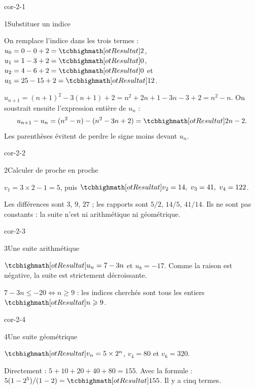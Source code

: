 \corrigesSouples

\begin{blocLivre}{cor-2-1}
\begin{corrige}{1}{Substituer un indice}
\begin{questions}
\item On remplace l’indice dans les trois termes : $u_0=0-0+2=\res{2}$,
$u_1=1-3+2=\res{0}$, $u_2=4-6+2=\res{0}$ et $u_5=25-15+2=\res{12}$.
\item $u_{n+1}=(n+1)^2-3(n+1)+2=n^2+2n+1-3n-3+2=n^2-n$.
On soustrait ensuite l’expression entière de $u_n$ :
\[u_{n+1}-u_n=(n^2-n)-(n^2-3n+2)=\res{2n-2}.\]
Les parenthèses évitent de perdre le signe moins devant $u_n$.
\end{questions}

\end{corrige}
\end{blocLivre}
\begin{blocLivre}{cor-2-2}
\begin{corrige}{2}{Calculer de proche en proche}
\begin{questions}\item $v_1=3\times2-1=5$, puis $\res{v_2=14,\ v_3=41,\ v_4=122}$.
\item Les différences sont $3$, $9$, $27$ ; les rapports sont $5/2$, $14/5$, $41/14$.
Ils ne sont pas constants : la suite n'est ni arithmétique ni géométrique.
\end{questions}
\end{corrige}
\end{blocLivre}
\begin{blocLivre}{cor-2-3}
\begin{corrige}{3}{Une suite arithmétique}
\begin{questions}\item $\res{u_n=7-3n}$ et $u_8=-17$. Comme la raison est négative, la suite est strictement décroissante.
\item $7-3n\leq-20\iff n\geq9$ : les indices cherchés sont tous les entiers $\res{n\geq9}$.
\end{questions}
\end{corrige}
\end{blocLivre}
\begin{blocLivre}{cor-2-4}
\begin{corrige}{4}{Une suite géométrique}
\begin{questions}\item $\res{v_n=5\times2^n}$, $v_4=80$ et $v_6=320$.
\item Directement : $5+10+20+40+80=155$.
Avec la formule : $5(1-2^5)/(1-2)=\res{155}$. Il y a cinq termes.
\end{questions}
\end{corrige}
\end{blocLivre}
